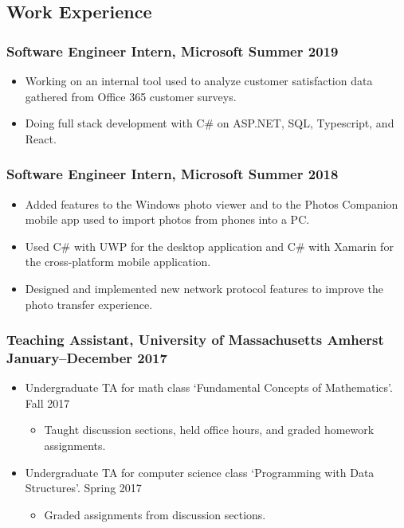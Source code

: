 \documentclass{article}
\begin{document}
	\subsection*{Work Experience}
		\subsubsection*{Software Engineer Intern, Microsoft \hfill \normalfont \normalsize Summer 2019}
			\begin{itemize}[noitemsep,leftmargin=40pt]
				\item Working on an internal tool used to analyze customer satisfaction data gathered from Office 365 customer surveys.
				\item Doing full stack development with C\# on ASP.NET, SQL, Typescript, and React.
			\end{itemize}
		\subsubsection*{Software Engineer Intern, Microsoft \hfill \normalfont \normalsize Summer 2018}
        	\begin{itemize}[noitemsep,leftmargin=40pt]
            	\item Added features to the Windows photo viewer and to the Photos Companion mobile app used to import photos from phones into a PC.
                \item Used C\# with UWP for the desktop application and C\# with Xamarin for the cross-platform mobile application.
                \item Designed and implemented new network protocol features to improve the photo transfer experience.
            \end{itemize}
        \subsubsection*{Teaching Assistant, University of Massachusetts Amherst \hfill \normalfont \normalsize January--December 2017}
        	\begin{itemize}[noitemsep,leftmargin=40pt]
            	\item Undergraduate TA for math class `Fundamental Concepts of Mathematics'. \hfill \normalfont \normalsize Fall 2017
                \begin{itemize}[noitemsep]
                	\item Taught discussion sections, held office hours, and graded homework assignments.
                \end{itemize}
                \item Undergraduate TA for computer science class `Programming with Data Structures'. \hfill \normalfont \normalsize Spring 2017
                \begin{itemize}[noitemsep]
                	\item Graded assignments from discussion sections.
                \end{itemize}
            \end{itemize}
\end{document}
